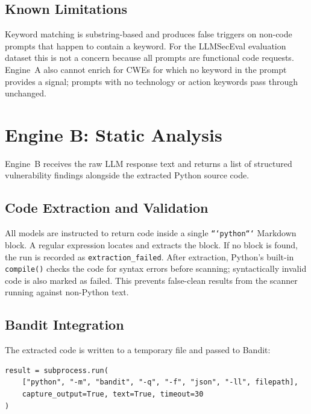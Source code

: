 \documentclass[12pt,a4paper]{report}
\begin{document}
\subsection{Known Limitations}

Keyword matching is substring-based and produces false triggers on non-code
prompts that happen to contain a keyword. For the LLMSecEval evaluation dataset
this is not a concern because all prompts are functional code requests.
Engine~A also cannot enrich for CWEs for which no keyword in the prompt provides
a signal; prompts with no technology or action keywords pass through unchanged.

\section{Engine B: Static Analysis}
\label{sec:engineb}

Engine~B receives the raw LLM response text and returns a list of structured
vulnerability findings alongside the extracted Python source code.

\subsection{Code Extraction and Validation}

All models are instructed to return code inside a single \texttt{```python```}
Markdown block. A regular expression locates and extracts the block. If no block
is found, the run is recorded as \texttt{extraction\_failed}. After extraction,
Python's built-in \texttt{compile()} checks the code for syntax errors before
scanning; syntactically invalid code is also marked as failed. This prevents
false-clean results from the scanner running against non-Python text.

\subsection{Bandit Integration}

The extracted code is written to a temporary file and passed to Bandit:

\begin{lstlisting}[caption={Bandit invocation in \texttt{engine\_b\_scan.py}},
                   label={lst:bandit}]
result = subprocess.run(
    ["python", "-m", "bandit", "-q", "-f", "json", "-ll", filepath],
    capture_output=True, text=True, timeout=30
)
\end{lstlisting}
\end{document}

